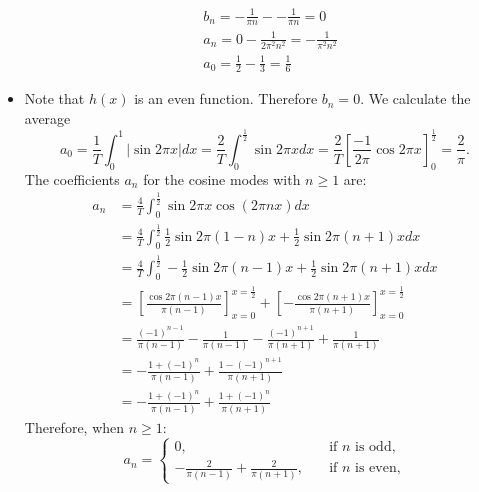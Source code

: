 \documentclass[11pt]{article}
\begin{document}
\begin{solution}
\begin{itemize}
\begin{align*}
                    &b_n = -\frac{1}{\pi n} - - \frac{1}{\pi n} = 0
                    \\& 
            a_n = 0 - \frac{1}{2\pi^2 n^2} =  - \frac{1}{\pi^2 n^2} 
                    \\&
            a_0 = \frac{1}{2} - \frac{1}{3} = \frac{1}{6}
        \end{align*}	
        \item
        Note that $h(x)$ is an even function.
        Therefore $b_n = 0$. 
        We calculate the average 
        \[
            a_0 
            = 
            \frac{1}{T} \int_{0}^{1} |\sin 2\pi x| dx  
            = 
            \frac{2}{T} \int_{0}^{\frac 1 2} \sin 2\pi x dx  
            =  
            \frac 2 T
            \left[ \frac{-1}{2\pi} \cos{2\pi x} \right]_{0}^{\frac 1 2} 
            =
            \frac{2}{\pi} 
            .
        \]
        The coefficients $a_n$ for the cosine modes with $n \geq 1$ are:
        \begin{align*}
            a_n 
            &
            = 
            \frac{4}{T}
            \int_{0}^{\frac 1 2} \sin 2\pi x \cos(2\pi n x) dx
            \\&
            =
            \frac{4}{T}
            \int_{0}^{\frac 1 2} \frac 1 2 \sin{2\pi(1-n)x} + \frac 1 2 \sin{2\pi(n+1)x} dx
            \\&
		=
            \frac{4}{T}
            \int_{0}^{\frac 1 2} -\frac 1 2 \sin{2\pi(n-1)x} + \frac 1 2 \sin{2\pi(n+1)x} dx
            \\&
            =
            \left[\frac{ \cos2\pi(n-1)x }{ \pi(n-1) } \right]_{x=0}^{x=\frac 1 2}
            +
            \left[- \frac{ \cos2\pi(n+1)x }{ \pi(n+1) } \right]_{x=0}^{x=\frac 1 2}
            \\&
            = 
            \frac{(-1)^{n-1}}{\pi(n-1)} -  \frac{1}{\pi(n-1)}  - \frac{(-1)^{n+1}}{\pi(n+1)} + \frac{1}{\pi(n+1)}
            \\&
            = -\frac{1+(-1)^{n}}{\pi(n-1)} +  \frac{1-(-1)^{n+1}}{\pi(n+1)} 
            \\&
            = -\frac{1+(-1)^{n}}{\pi(n-1)} +  \frac{1+(-1)^{n}}{\pi(n+1)} 
        \end{align*}	
        Therefore, when $n \geq 1$:
        \[a_n = 
        \begin{cases}
        0 ,\quad &\text{if } n\text{ is odd,}\\
        -\frac{2}{\pi(n-1)} + \frac{2}{\pi(n+1)}  ,\quad &\text{if } n\text{ is even,}
        \end{cases}
        \]
       \end{itemize}
\end{solution}
\end{document}
